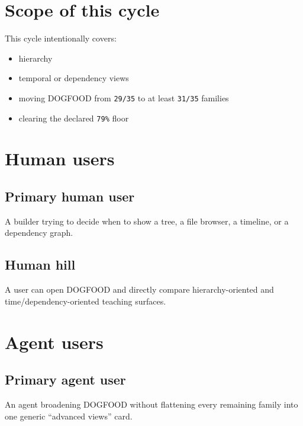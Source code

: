 \section{Scope of this cycle}\label{record-079-scope-of-this-cycle}

This cycle intentionally covers:

\begin{itemize}
\tightlist
\item
  hierarchy
\item
  temporal or dependency views
\item
  moving DOGFOOD from \texttt{2\allowbreak{}9\allowbreak{}/\allowbreak{}3\allowbreak{}5} to at least \texttt{3\allowbreak{}1\allowbreak{}/\allowbreak{}3\allowbreak{}5} families
\item
  clearing the declared \texttt{7\allowbreak{}9\allowbreak{}\%} floor
\end{itemize}

\section{Human users}\label{record-079-human-users}

\subsection{Primary human user}\label{record-079-primary-human-user}

A builder trying to decide when to show a tree, a file browser, a timeline, or a dependency graph.

\subsection{Human hill}\label{record-079-human-hill}

A user can open DOGFOOD and directly compare hierarchy-oriented and time/dependency-oriented teaching surfaces.

\section{Agent users}\label{record-079-agent-users}

\subsection{Primary agent user}\label{record-079-primary-agent-user}

An agent broadening DOGFOOD without flattening every remaining family into one generic ``advanced views'' card.

